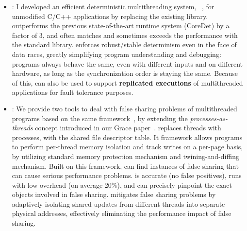 \begin{itemize}
\item \Dthreads{}:
I developed an efficient deterministic multithreading system, \dthreads{}~\cite{dthreads}, for unmodified C/C++ applications by replacing the existing \pthreads{} library.
\dthreads{} outperforms the previous state-of-the-art runtime system (CoreDet) by a factor of 3, and often matches and sometimes exceeds the performance with the standard \pthreads{} library. \Dthreads{} enforces robust/stable determinism even in the face of data races, 
greatly simplifying program understanding and debugging: 
programs always behave the same, even with different inputs and on different hardware, as long as the synchronization order is staying the same. Because of this, \dthreads{} can also be used to support \textbf{replicated executions} 
of multithreaded applications for fault tolerance purposes.

\item \Sheriff{}:
We provide two tools to deal with false sharing problems
of multithreaded programs based on the same \Sheriff{} framework~\cite{sheriff}, by extending the \emph{processes-as-threads} concept introduced in our Grace paper~\cite{grace}.
\sheriff{} replaces threads with processes, with the shared file descriptor table. It framework allows programs to perform per-thread memory isolation and track writes on a per-page basis, by utilizing standard memory protection mechanism and  twining-and-diffing mechanism.
Built on this framework, \SheriffDetect{} can find instances of false sharing that can cause serious performance problems. 
\SheriffDetect{} is accurate (no false positives), runs with low overhead (on average 20\%), and can precisely pinpoint the exact objects involved in false sharing.
\SheriffProtect{} mitigates false sharing problems by adaptively isolating shared 
updates from different threads into separate physical addresses, effectively 
eliminating the performance impact of false sharing. 





\end{itemize}
